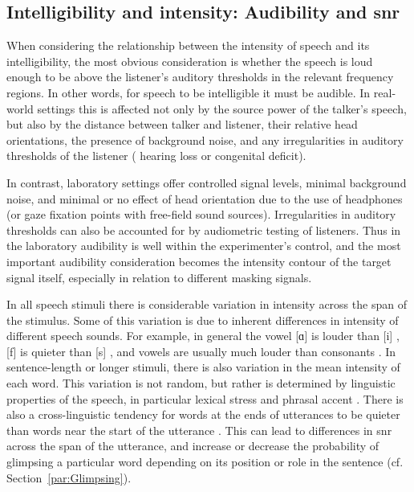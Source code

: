 
\subsection[Intelligibility and intensity]{Intelligibility and intensity: Audibility and \ac{snr}\label{sec:IntelIntens}}
When considering the relationship between the intensity of speech and its intelligibility, the most obvious consideration is whether the speech is loud enough to be above the listener’s auditory thresholds in the relevant frequency regions.  In other words, for speech to be intelligible it must be audible.  In real-world settings this is affected not only by the source power of the talker’s speech, but also by the distance between talker and listener, their relative head orientations, the presence of background noise, and any irregularities in auditory thresholds of the listener (\ie{} hearing loss or congenital deficit).

In contrast, laboratory settings offer controlled signal levels, minimal background noise, and minimal or no effect of head orientation due to the use of headphones (or gaze fixation points with free-field sound sources).  Irregularities in auditory thresholds can also be accounted for by audiometric testing of listeners.  Thus in the laboratory audibility is well within the experimenter’s control, and the most important audibility consideration becomes the intensity contour of the target signal itself, especially in relation to different masking signals.%

In all speech stimuli there is considerable variation in intensity across the span of the stimulus.  Some of this variation is due to inherent differences in intensity of different speech sounds.  For example, in general the vowel [ɑ] is louder than [i] \citep{Ladefoged1967}, [f] is quieter than [s] \citep{sowl}, and vowels are usually much louder than consonants \citep{HoriiEtAl1971}.  In sentence-length or longer stimuli, there is also variation in the mean intensity of each word.  This variation is not random, but rather is determined by linguistic properties of the speech, in particular lexical stress and phrasal accent \citep{Fry1955, SluijterVanHeuven1996, PlagEtAl2011}.  There is also a cross-linguistic tendency for words at the ends of utterances to be quieter than words near the start of the utterance \citep{StrikBoves1995, TrouvainEtAl1998}.  This can lead to differences in \ac{snr} across the span of the utterance, and increase or decrease the probability of glimpsing a particular word depending on its position or role in the sentence (cf. Section~\ref{par:Glimpsing}).  

